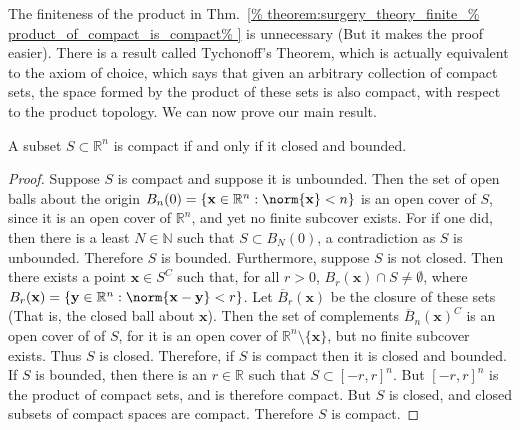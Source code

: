 \documentclass[crop=false,class=article,oneside]{standalone}
\begin{document}
        The finiteness of the product in Thm.~\ref{%
            theorem:surgery_theory_finite_%
            product_of_compact_is_compact%
        } is
        unnecessary (But it makes the proof easier). There
        is a result called Tychonoff's Theorem, which is
        actually equivalent to the axiom of choice, which
        says that given an arbitrary collection of compact sets,
        the space formed by the product of these sets is also
        compact, with respect to the product topology.
        We can now prove our main result.
        \begin{theorem}
            \label{theorem:surgery_theory_Heine_Borel}
            A subset $S\subset\mathbb{R}^{n}$ is compact if
            and only if it closed and bounded.
        \end{theorem}
        \begin{proof}
            Suppose $S$ is compact and
            suppose it is unbounded. Then the set of open
            balls about the origin
            $B_{n}(0)=\{\mathbf{x}\in\mathbb{R}^{n}%
                        :\norm{\mathbf{x}}<n\}$
            is an open cover of $S$, since it is an open
            cover of $\mathbb{R}^{n}$, and yet no
            finite subcover exists. For if one did, then there
            is a least $N\in\mathbb{N}$ such that
            $S\subset{B_{N}(0)}$, a contradiction as
            $S$ is unbounded. Therefore $S$ is bounded.
            Furthermore, suppose $S$ is
            not closed. Then there exists a point
            $\mathbf{x}\in{S^{C}}$ such that, for all
            $r>0$, $B_{r}(\mathbf{x})\cap{S}\ne\emptyset$,
            where
            $B_{r}(\mathbf{x})=\{\mathbf{y}\in\mathbb{R}^{n}:%
             \norm{\mathbf{x}-\mathbf{y}}<r\}$.
            Let $\overline{B}_{r}(\mathbf{x})$ be the
            closure of these sets (That is, the closed ball
            about $\mathbf{x}$). Then the set of complements
            $\overline{B}_{n}(\mathbf{x})^{C}$ is an open
            cover of of $S$, for it is an open cover of
            $\mathbb{R}^{n}\setminus\{\mathbf{x}\}$, but no
            finite subcover exists. Thus $S$ is closed. Therefore,
            if $S$ is compact then it is closed and bounded.
            If $S$ is bounded, then there is an $r\in\mathbb{R}$
            such that $S\subset[-r,r]^{n}$. But
            $[-r,r]^{n}$ is the product of compact sets, and
            is therefore compact. But $S$ is closed, and closed
            subsets of compact spaces are compact. Therefore
            $S$ is compact.
        \end{proof}
\end{document}
